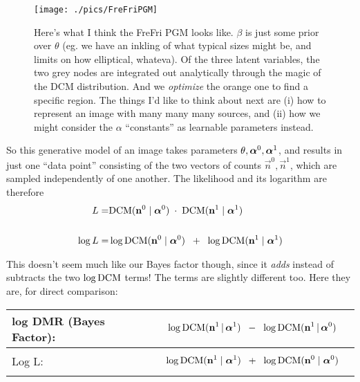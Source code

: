\documentclass[12pt]{article}
\begin{document}
\begin{figure}
\texttt{[image: ./pics/FreFriPGM]}
\caption{Here's what I think the {\sc FreFri} PGM looks like. $\beta$ is just some prior over $\theta$ (eg. we have an inkling of what typical sizes might be, and limits on how elliptical, whateva). Of the three latent variables, the two grey nodes are integrated out analytically through the magic of the DCM distribution. And we {\it optimize} the orange one to find a specific region. The things I'd like to think about next are (i) how to represent an image with many many many sources, and (ii) how we might consider the $\alpha$ ``constants'' as learnable parameters instead.
\label{fig:FreFriPGM}
}
\end{figure}

So this generative model of an image takes parameters $\theta,
\boldsymbol\alpha^0, \boldsymbol\alpha^1$, and results in just one ``data point''
consisting of the two vectors of counts $\vec{n}^0,\vec{n}^1$, which are sampled independently of one another.  The
likelihood and its logarithm are therefore
\begin{align*}
L =& \mbox{DCM}(\mathbf{n}^0 \mid \boldsymbol\alpha^0) \; \cdot \; \mbox{DCM}(\mathbf{n}^1 \mid \boldsymbol\alpha^1) 
\\ \\
\log L =& \log \mbox{DCM}(\mathbf{n}^0 \mid \boldsymbol\alpha^0) \;\; + \;\; \log \mbox{DCM}(\mathbf{n}^1 \mid \boldsymbol\alpha^1) 
\end{align*}

This doesn't seem much like our Bayes factor though, since it
\emph{adds} instead of subtracts the two $\log \mbox{DCM}$ terms! The terms
are slightly different too.  Here they are, for direct comparison:

\begin{tabular}{|l|l|}
\hline
log DMR (Bayes Factor): & 
\parbox{.7\textwidth}{
\begin{align*}
&\log \mbox{DCM}(\mathbf{n}^1 \,|\, \boldsymbol\alpha^1) \;\;-\;\; \log \mbox{DCM}(\mathbf{n}^1 \,|\, \boldsymbol\alpha^0)
\end{align*}
} \\
\hline
Log L: & 
\parbox{.7\textwidth}{
\begin{align*}
& \log \mbox{DCM}(\mathbf{n}^1 \mid \boldsymbol\alpha^1) \;\; + \;\; \log \mbox{DCM}(\mathbf{n}^0 \mid \boldsymbol\alpha^0)
\end{align*}
} \\
\hline
\end{tabular}
\end{document}
